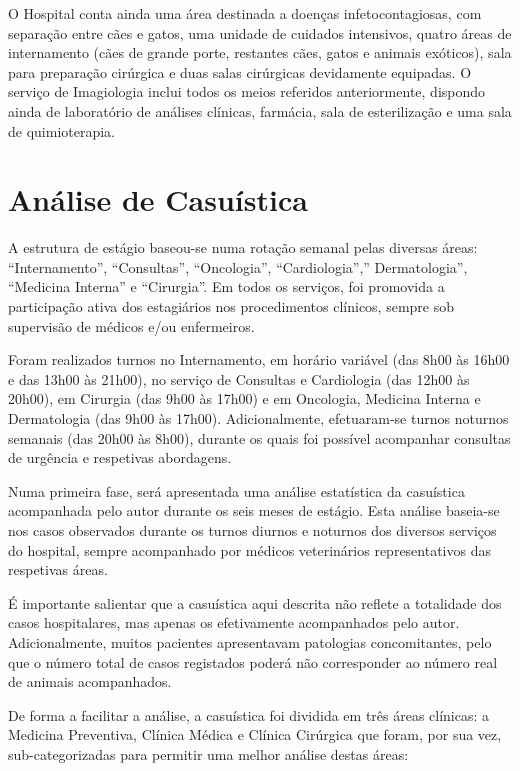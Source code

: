 O Hospital conta ainda uma área destinada a doenças infetocontagiosas, com separação entre cães e gatos, uma unidade de cuidados intensivos, quatro áreas de internamento (cães de grande porte, restantes cães, gatos e animais exóticos), sala para preparação cirúrgica e duas salas cirúrgicas devidamente equipadas. O serviço de Imagiologia inclui todos os meios referidos anteriormente, dispondo ainda de laboratório de análises clínicas, farmácia, sala de esterilização e uma sala de quimioterapia.

\section{Análise de Casuística}

A estrutura de estágio baseou-se numa rotação semanal pelas diversas áreas: “Internamento”, “Consultas”, “Oncologia”, “Cardiologia”,” Dermatologia”, “Medicina Interna” e “Cirurgia”. Em todos os serviços, foi promovida a participação ativa dos estagiários nos procedimentos clínicos, sempre sob supervisão de médicos e/ou enfermeiros.

Foram realizados turnos no Internamento, em horário variável (das 8h00 às 16h00 e das 13h00 às 21h00), no serviço de Consultas e Cardiologia (das 12h00 às 20h00), em Cirurgia (das 9h00 às 17h00) e em Oncologia, Medicina Interna e Dermatologia (das 9h00 às 17h00). Adicionalmente, efetuaram-se turnos noturnos semanais (das 20h00 às 8h00), durante os quais foi possível acompanhar consultas de urgência e respetivas abordagens.

Numa primeira fase, será apresentada uma análise estatística da casuística acompanhada pelo autor durante os seis meses de estágio. Esta análise baseia-se nos casos observados durante os turnos diurnos e noturnos dos diversos serviços do hospital, sempre acompanhado por médicos veterinários representativos das respetivas áreas.

É importante salientar que a casuística aqui descrita não reflete a totalidade dos casos hospitalares, mas apenas os efetivamente acompanhados pelo autor. Adicionalmente, muitos pacientes apresentavam patologias concomitantes, pelo que o número total de casos registados poderá não corresponder ao número real de animais acompanhados.

De forma a facilitar a análise, a casuística foi dividida em três áreas clínicas: a Medicina Preventiva, Clínica Médica e Clínica Cirúrgica que foram, por sua vez, sub-categorizadas para permitir uma melhor análise destas áreas:


